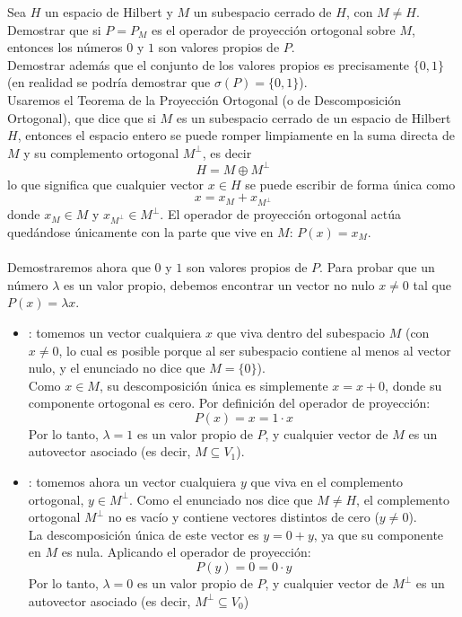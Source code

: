 \begin{ejercicio}
    Sea $H$ un espacio de Hilbert y $M$ un subespacio cerrado de $H$, con $M \neq H$. Demostrar que si $P = P_M$ es el operador de proyección ortogonal sobre $M$, entonces los números $0$ y $1$ son valores propios de $P$. \\
    Demostrar además que el conjunto de los valores propios es precisamente $\{0,1\}$ \big(en realidad se podría demostrar que $\sigma(P) = \{0,1\}$\big). \\

    \noindent
    Usaremos el Teorema de la Proyección Ortogonal (o de Descomposición Ortogonal), que dice que si $M$ es un subespacio cerrado de un espacio de Hilbert $H$, entonces el espacio entero se puede romper limpiamente en la suma directa de $M$ y su complemento ortogonal $M^\perp$, es decir
    $$H = M \oplus M^\perp$$
    lo que significa que cualquier vector $x \in H$ se puede escribir de forma única como
    $$x = x_M + x_{M^\perp}$$
    donde $x_M \in M$ y $x_{M^\perp} \in M^\perp$. El operador de proyección ortogonal actúa quedándose únicamente con la parte que vive en $M$: $P(x) = x_M$. \\  \\
    \noindent
    Demostraremos ahora que $0$ y $1$ son valores propios de $P$. Para probar que un número $\lambda$ es un valor propio, debemos encontrar un vector no nulo $x \neq 0$ tal que $P(x) = \lambda x$.
    \begin{itemize}
        \item {}: tomemos un vector cualquiera $x$ que viva dentro del subespacio $M$ (con $x \neq 0$, lo cual es posible porque al ser subespacio contiene al menos al vector nulo, y el enunciado no dice que $M = \{0\}$). \\
        \noindent
        Como $x \in M$, su descomposición única es simplemente $x = x + 0$, donde su componente ortogonal es cero. Por definición del operador de proyección:$$P(x) = x = 1 \cdot x$$Por lo tanto, $\lambda = 1$ es un valor propio de $P$, y cualquier vector de $M$ es un autovector asociado (es decir, $M \subseteq V_1$).
        \item {}: tomemos ahora un vector cualquiera $y$ que viva en el complemento ortogonal, $y \in M^\perp$. Como el enunciado nos dice que $M \neq H$, el complemento ortogonal $M^\perp$ no es vacío y contiene vectores distintos de cero ($y \neq 0$). \\
        \noindent
        La descomposición única de este vector es $y = 0 + y$, ya que su componente en $M$ es nula. Aplicando el operador de proyección:$$P(y) = 0 = 0 \cdot y$$Por lo tanto, $\lambda = 0$ es un valor propio de $P$, y cualquier vector de $M^\perp$ es un autovector asociado (es decir, $M^\perp \subseteq V_0$)

\end{itemize}
\end{ejercicio}
